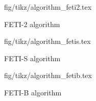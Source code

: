 \begin{figure}[h!]
\centering
{fig/tikz/algorithm_feti2.tex}
\caption[FETI-2 algorithm]{FETI-2 algorithm}
\label{diag:feti2}
\end{figure}

\begin{figure}[h!]
\centering
{fig/tikz/algorithm_fetis.tex}
\caption[FETI-S algorithm]{FETI-S algorithm}
\label{diag:fetis}
\end{figure}

\begin{figure}[h!]
\centering
{fig/tikz/algorithm_fetib.tex}
\caption[FETI-B algorithm]{FETI-B algorithm}
\label{diag:fetib}
\end{figure}